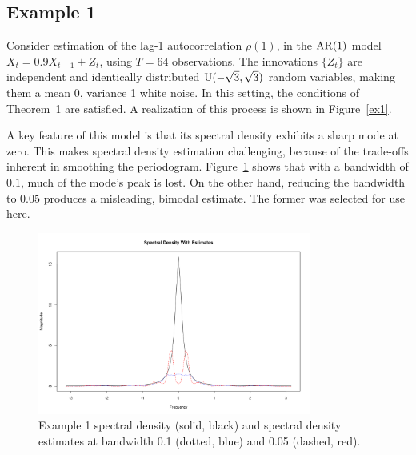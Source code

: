 \subsection*{Example 1}
Consider estimation of the lag-1 autocorrelation $\rho(1)$,
in the $\operatorname{AR}(1)$ model $X_t = 0.9 X_{t-1} + Z_t$,
using $T = 64$ observations.
The innovations $\{Z_t\}$ are independent and identically distributed
$\operatorname{U}(-\sqrt{3}, \sqrt{3})$ random variables,
making them a mean 0, variance 1 white noise.
In this setting, the conditions of Theorem~1 are satisfied.
A realization of this process is shown in Figure~\ref{ex1}.

A key feature of this model is that its spectral density exhibits a sharp
mode at zero.
This makes spectral density estimation challenging,
because of the trade-offs inherent in smoothing the periodogram.
Figure~\ref{ex1_spec} shows that with a bandwidth of $0.1$,
much of the mode's peak is lost.
On the other hand, reducing the bandwidth to $0.05$ produces a misleading,
bimodal estimate.
The former was selected for use here.
    \begin{figure}[ht]
    \centering
    \includegraphics[width = 0.8\textwidth]{../res/ex1_spec.png}
    \caption{
        Example 1
        spectral density (solid, black) and spectral density estimates
        at bandwidth 0.1 (dotted, blue) and 0.05 (dashed, red).
        }
    \label{ex1_spec}
    \end{figure}

